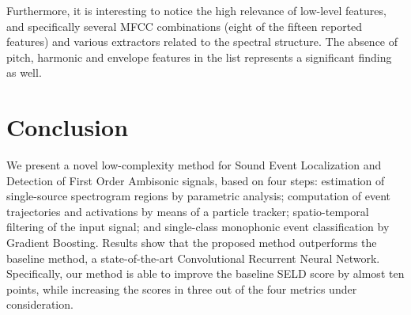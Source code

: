 Furthermore, it is interesting to notice the high relevance of low-level features, and specifically several MFCC combinations (eight of the fifteen reported features) and  various extractors related to the spectral structure. The absence of pitch, harmonic and envelope features in the list represents a significant finding as well. 







\section{Conclusion}
\label{sec:results}


We present a novel low-complexity method for Sound Event Localization and Detection of First Order Ambisonic signals, based on four steps: estimation of single-source spectrogram regions by parametric analysis; computation of event trajectories and activations by means of a particle tracker; spatio-temporal filtering of the input signal; and single-class monophonic event classification by Gradient Boosting. 
Results show that the proposed method outperforms the baseline method, a state-of-the-art Convolutional Recurrent Neural Network. Specifically, our method is able to improve the baseline SELD score by almost ten points, while increasing the scores in three out of the four metrics under consideration.


